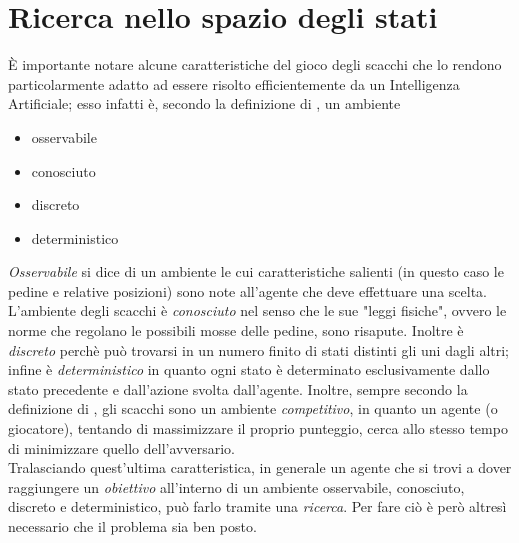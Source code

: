 \section{Ricerca nello spazio degli stati}


È importante notare alcune caratteristiche del gioco degli scacchi che lo rendono particolarmente adatto ad essere risolto efficientemente da un Intelligenza Artificiale; esso infatti è, secondo la definizione di \cite{randw}, un ambiente
\begin{itemize}
   \item osservabile
   \item conosciuto
   \item discreto
   \item deterministico
\end{itemize}

\emph{Osservabile} si dice di un ambiente le cui caratteristiche salienti (in questo caso le pedine e relative posizioni) sono note all'agente che deve effettuare una scelta.
L'ambiente degli scacchi è \emph{conosciuto} nel senso che le sue "leggi fisiche", ovvero le norme che regolano le possibili mosse delle pedine, sono risapute.
Inoltre è \emph{discreto} perchè può trovarsi in un numero finito di stati distinti gli uni dagli altri; infine è \emph{deterministico} in quanto ogni stato è determinato esclusivamente dallo stato precedente e dall'azione svolta dall'agente.
Inoltre, sempre secondo la definizione di \cite{randw}, gli scacchi sono un ambiente \emph{competitivo}, in quanto un agente (o giocatore), tentando di massimizzare il proprio punteggio, cerca allo stesso tempo di minimizzare quello dell'avversario.\\
Tralasciando quest'ultima caratteristica, in generale un agente che si trovi a dover raggiungere un \emph{obiettivo} all'interno di un ambiente osservabile, conosciuto, discreto e deterministico, può farlo tramite una \emph{ricerca}.
Per fare ciò è però altresì necessario che il problema sia ben posto.

